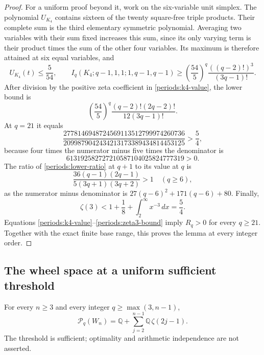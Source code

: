 \begin{proof}
For a uniform proof beyond it, work on the six-variable unit simplex.
The polynomial $U_{K_4}$ contains sixteen of the twenty square-free
triple products.  Their complete sum is the third elementary symmetric
polynomial.  Averaging two variables with their sum fixed increases
this sum, since its only varying term is their product times the sum
of the other four variables.  Its maximum is therefore attained at
six equal variables, and
\begin{equation}
 U_{K_4}(t)\le\frac5{54},\qquad
 I_q(K_4;q-1,1,1;1,q-1,q-1)
 \ge\left(\frac{54}{5}\right)^q
 \frac{((q-2)!)^3}{(3q-1)!}.
 \label{periods:k4-integral-lower}
\end{equation}
After division by the positive zeta coefficient in
\eqref{periods:k4-value}, the lower bound is
\begin{equation}
 \left(\frac{54}{5}\right)^q
 \frac{(q-2)!(2q-2)!}{12(3q-1)!}.
 \label{periods:lower-ratio}
\end{equation}
At $q=21$ it equals
\begin{equation}
 \frac{2778146948724569113512799974260736}
 {2099879042434213173389434814453125}>\frac54,
 \label{periods:q21-ratio}
\end{equation}
because four times the numerator minus five times the denominator is
\[
 613192582727210587104025824777319>0.
\]
The ratio of
\eqref{periods:lower-ratio} at $q+1$ to its value at $q$ is
\begin{equation}
 \frac{36(q-1)(2q-1)}{5(3q+1)(3q+2)}>1\quad(q\ge6),
 \label{periods:ratio-growth}
\end{equation}
as the numerator minus denominator is
$27(q-6)^2+171(q-6)+80$.  Finally,
\begin{equation}
 \zeta(3)<1+\frac18+\int_2^{\infty}x^{-3}\,dx=\frac54.
 \label{periods:zeta3-bound}
\end{equation}
Equations \eqref{periods:k4-value}--\eqref{periods:zeta3-bound} imply
$R_q>0$ for every $q\ge21$.  Together with the exact finite base range,
this proves the lemma at every integer order.
\end{proof}

\subsection{The wheel space at a uniform sufficient threshold}
\label{periods:wheel-threshold}

\begin{theorem}
\label{periods:wheel-span}
For every $n\ge3$ and every integer $q\ge\max(3,n-1)$,
\begin{equation}
 \boxed{
 \mathcal P_q(W_n)=
 \mathbb Q+\sum_{j=2}^{n-1}\mathbb Q\,\zeta(2j-1).}
 \label{periods:wheel-space}
\end{equation}
The threshold is sufficient; optimality and arithmetic independence are
not asserted.
\end{theorem}

